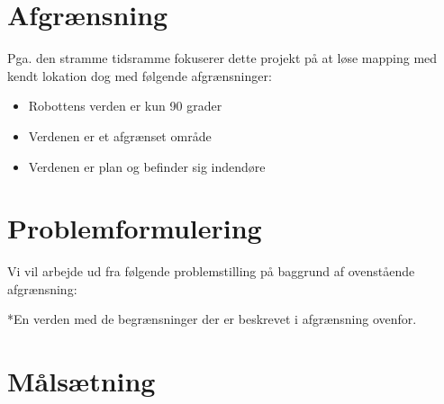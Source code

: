 \section*{Afgrænsning}
Pga. den stramme tidsramme fokuserer dette projekt på at løse mapping med kendt lokation dog med følgende afgrænsninger:
\begin{itemize}
\item Robottens verden er kun 90 grader
\item Verdenen er et afgrænset område
\item Verdenen er plan og befinder sig indendøre
\end{itemize}

\section*{Problemformulering}\label{problemformulering}
Vi vil arbejde ud fra følgende problemstilling på baggrund af ovenstående afgrænsning:

\begin{samepage}


\end{samepage}
*En verden med de begrænsninger der er beskrevet i afgrænsning ovenfor.

\section*{Målsætning}
